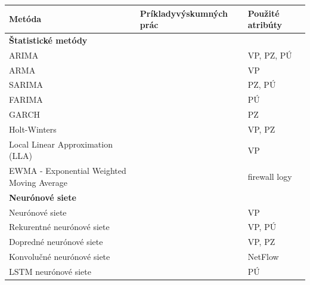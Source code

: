 \documentclass[thesismargins, thesislinespacing, openright, upjsfrontpage]{rnthesis}
\begin{document}
\begin{table}
    \centering
    \begin{tabular}{ | p{6cm} | p{4cm} | p{4cm} | }
         \hline \textbf{Metóda} & \textbf{Príklady\newline výskumných prác} & \textbf{Použité atribúty} \\

         \hline \multicolumn{2}{l}{\textbf{Štatistické metódy}} \\
         \hline ARIMA & \cite{madan2018predicting,papagiannaki2005long,condon2008analysis,roumani2015time,tang2018disclosure,tang2017big,pokhrel2017cybersecurity,werner2017time,cortez2012multi} & VP, PZ, PÚ \\
         \hline ARMA & \cite{wei2012intrusion,sang2002predictability} & VP \\
         \hline SARIMA & \cite{tang2016exploiting,condon2008analysis,roumani2015time,tang2018disclosure} & PZ, PÚ \\
         \hline FARIMA & \cite{zhan2015predicting} & PÚ \\
         \hline GARCH & \cite{tang2016exploiting,tang2018disclosure,tang2017big} & PZ \\
         \hline Holt-Winters & \cite{cortez2012multi,roumani2015time} & VP, PZ \\
         \hline Local Linear Approximation (LLA) & \cite{hasegawa2001applications} & VP \\
         \hline EWMA - Exponential Weighted Moving Average & \cite{soldo2011blacklisting} & firewall logy \\

         
         
         \hline \multicolumn{2}{l}{\textbf{Neurónové siete}} \\
         \hline Neurónové siete & \cite{Leau2015,wang2008internet} & VP \\
         \hline Rekurentné neurónové siete & \cite{madan2018predicting,fang2019deep} & VP, PÚ \\
         \hline Dopredné neurónové siete & \cite{cortez2012multi,pokhrel2017cybersecurity} & VP, PZ \\
         \hline Konvolučné neurónové siete & \cite{millar2019using} & NetFlow \\
         \hline LSTM neurónové siete & \cite{fang2019deep} & PÚ \\
         

\end{tabular}
\end{table}
\end{document}
